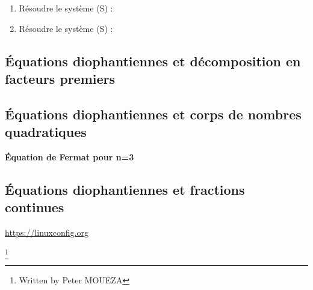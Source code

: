 \documentclass{article}
\begin{document}
\begin{enumerate}
        \item Résoudre le système (S) :  
       \item Résoudre le système (S) :  
\end{enumerate}


\subsection{Équations diophantiennes et décomposition en facteurs premiers}

\subsection{Équations diophantiennes et corps de nombres quadratiques}
\textbf{Équation de Fermat pour n=3}


\subsection{Équations diophantiennes et fractions continues}





\url{https://linuxconfig.org}

\footnote{Written by Peter MOUEZA}
\end{document}
